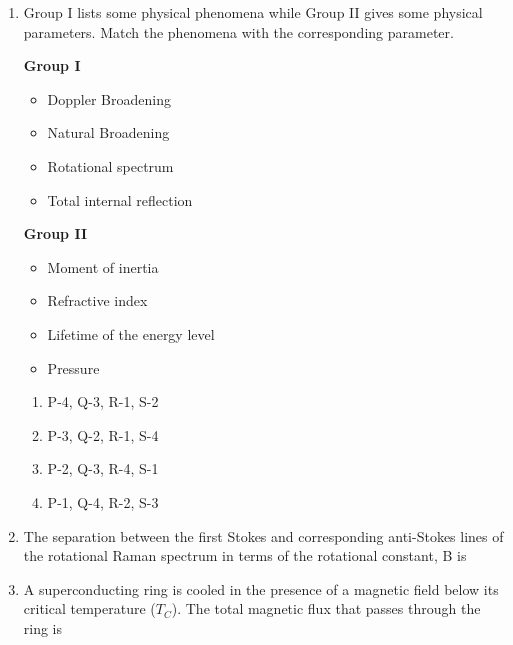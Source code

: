 \documentclass[14pt, a4paper]{extarticle}
\begin{document}
\begin{enumerate}[label=\textbf{Q. \arabic*}]
\item Group I lists some physical phenomena while Group II gives some physical parameters. Match the phenomena with the corresponding parameter.
    \begin{center}
    \begin{multicols}{2}
        \textbf{Group I}
        \begin{itemize}
            \item[P.] Doppler Broadening
            \item[Q.] Natural Broadening
            \item[R.] Rotational spectrum
            \item[S.] Total internal reflection
        \end{itemize}
        \textbf{Group II}
        \begin{itemize}
            \item[1.] Moment of inertia
            \item[2.] Refractive index
            \item[3.] Lifetime of the energy level
            \item[4.] Pressure
        \end{itemize}
    \end{multicols}
    \end{center}
    \begin{enumerate}
        \item P-4, Q-3, R-1, S-2
        \item P-3, Q-2, R-1, S-4
        \item P-2, Q-3, R-4, S-1
        \item P-1, Q-4, R-2, S-3
    \end{enumerate}

\item The separation between the first Stokes and corresponding anti-Stokes lines of the rotational Raman spectrum in terms of the rotational constant, B is
    \begin{enumerate}
    \end{enumerate}

\item A superconducting ring is cooled in the presence of a magnetic field below its critical temperature ($T_C$). 
The total magnetic flux that passes through the ring is
\begin{enumerate}
\end{enumerate}


\end{enumerate}
\end{document}
